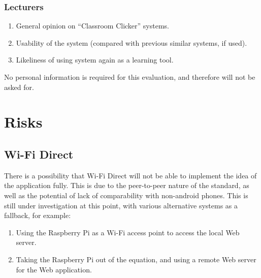 \documentclass{article}
\begin{document}
\subsubsection{Lecturers}
\begin{enumerate}
	\item General opinion on ``Classroom Clicker'' systems.
	\item Usability of the system (compared with previous similar systems, if used).
	\item Likeliness of using system again as a learning tool.
\end{enumerate}
No personal information is required for this evaluation, and therefore will not be asked for.


\section{Risks}
\subsection{Wi-Fi Direct}
There is a possibility that Wi-Fi Direct will not be able to implement the idea of the application fully. This is due to the peer-to-peer nature of the standard, as well as the potential of lack of comparability with non-android phones. This is still under investigation at this point, with various alternative systems as a fallback, for example:
\begin{enumerate}
	\item Using the Raspberry Pi as a Wi-Fi access point to access the local Web server.
	\item Taking the Raspberry Pi out of the equation, and using a remote Web server for the Web application.
\end{enumerate}
\end{document}

